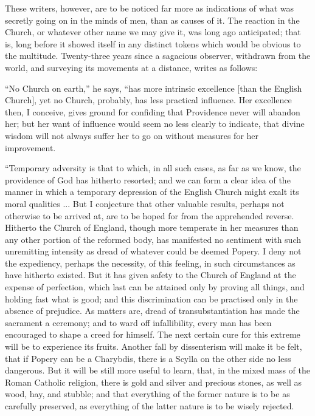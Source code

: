 These writers, however, are to be noticed far
more as indications of what was secretly going on in the minds of men,
than as causes of it. The reaction in the Church, or whatever other
name we may give it, was long ago anticipated; that is, long before it
showed itself in any distinct tokens which would be obvious to the
multitude. Twenty-three years since a sagacious observer, withdrawn
from the world, and surveying its movements at a distance, writes as
follows:

``No
Church on earth,'' he says, ``has more intrinsic excellence [than the
English Church], yet no Church, probably, has less practical
influence. Her excellence then, I conceive, gives ground for confiding
that Providence never will abandon her; but her want of influence
would seem no less clearly to indicate, that divine
wisdom will not always suffer her to go on without measures for her
improvement.

``Temporary
adversity is that to which, in all such cases, as far as we know, the
providence of God has hitherto resorted; and we can form a clear idea
of the manner in which a temporary depression of the English Church
might exalt its moral qualities ... But I conjecture that other
valuable results, perhaps not otherwise to be arrived at, are to be
hoped for from the apprehended reverse. Hitherto the Church of
England, though more temperate in her measures than any other portion
of the reformed body, has manifested no sentiment with such
unremitting intensity as dread of whatever could be deemed Popery. I
deny not the expediency, perhaps the necessity, of this feeling, in
such circumstances as have hitherto existed. But it has given safety
to the Church of England at the expense of perfection, which last can
be attained only by proving all things, and holding fast what is good;
and this discrimination can be practised only in the absence of
prejudice. As matters are, dread of transubstantiation has made the
sacrament a ceremony; and to ward off infallibility, every man has
been encouraged to shape a creed for himself. The next certain cure
for this extreme will be to experience its fruits. Another fall by
dissenterism will make it be felt, that if Popery can be a Charybdis,
there is a Scylla on the other side no less dangerous. But it will be
still more useful to learn, that, in the mixed mass of the Roman
Catholic religion, there is gold and silver and precious stones, as
well as wood, hay, and stubble; and that everything of the former
nature is to be as carefully preserved, as everything of the latter
nature is to be wisely rejected.

